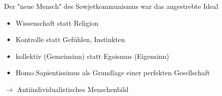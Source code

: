 \documentclass{article}
\begin{document}
Der "neue Mensch" des Sowjetkommunismus war das angestrebte Ideal
\begin{itemize}
    \item Wissenschaft statt Religion
    \item Kontrolle statt Gefühlen, Instinkten
    \item kollektiv (Gemeinsinn) statt Egoismus (Eigensinn)
    \item Homo Sapientissimus als Grundlage einer perfekten Gesellschaft
\end{itemize}
$\rightarrow$ Antiindividualistisches Menschenbild
\end{document}
